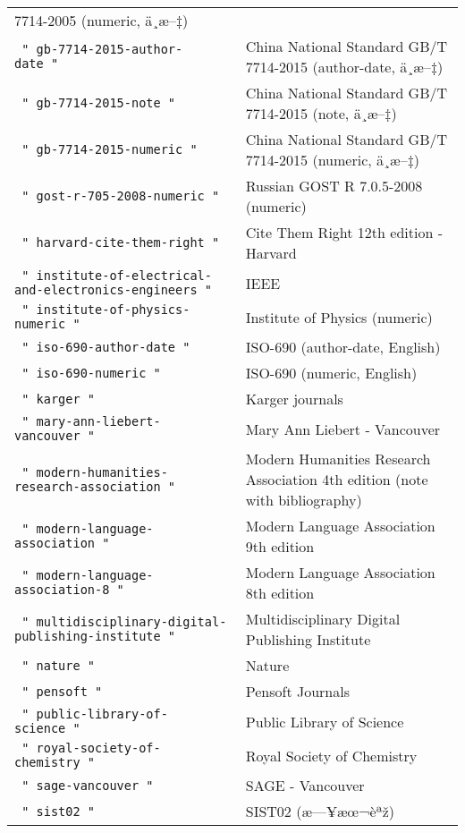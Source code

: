 \begin{longtable}[]{@{}ll@{}}
7714-2005 (numeric, ä¸­æ--‡) \\
\texttt{\ "\ gb-7714-2015-author-date\ "\ } & China National Standard
GB/T 7714-2015 (author-date, ä¸­æ--‡) \\
\texttt{\ "\ gb-7714-2015-note\ "\ } & China National Standard GB/T
7714-2015 (note, ä¸­æ--‡) \\
\texttt{\ "\ gb-7714-2015-numeric\ "\ } & China National Standard GB/T
7714-2015 (numeric, ä¸­æ--‡) \\
\texttt{\ "\ gost-r-705-2008-numeric\ "\ } & Russian GOST R 7.0.5-2008
(numeric) \\
\texttt{\ "\ harvard-cite-them-right\ "\ } & Cite Them Right 12th
edition - Harvard \\
\texttt{\ "\ institute-of-electrical-and-electronics-engineers\ "\ } &
IEEE \\
\texttt{\ "\ institute-of-physics-numeric\ "\ } & Institute of Physics
(numeric) \\
\texttt{\ "\ iso-690-author-date\ "\ } & ISO-690 (author-date,
English) \\
\texttt{\ "\ iso-690-numeric\ "\ } & ISO-690 (numeric, English) \\
\texttt{\ "\ karger\ "\ } & Karger journals \\
\texttt{\ "\ mary-ann-liebert-vancouver\ "\ } & Mary Ann Liebert -
Vancouver \\
\texttt{\ "\ modern-humanities-research-association\ "\ } & Modern
Humanities Research Association 4th edition (note with bibliography) \\
\texttt{\ "\ modern-language-association\ "\ } & Modern Language
Association 9th edition \\
\texttt{\ "\ modern-language-association-8\ "\ } & Modern Language
Association 8th edition \\
\texttt{\ "\ multidisciplinary-digital-publishing-institute\ "\ } &
Multidisciplinary Digital Publishing Institute \\
\texttt{\ "\ nature\ "\ } & Nature \\
\texttt{\ "\ pensoft\ "\ } & Pensoft Journals \\
\texttt{\ "\ public-library-of-science\ "\ } & Public Library of
Science \\
\texttt{\ "\ royal-society-of-chemistry\ "\ } & Royal Society of
Chemistry \\
\texttt{\ "\ sage-vancouver\ "\ } & SAGE - Vancouver \\
\texttt{\ "\ sist02\ "\ } & SIST02 (æ---¥æœ¬èªž) \\

\end{longtable}
